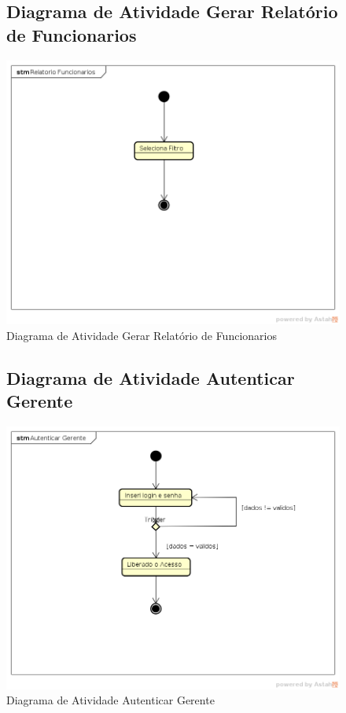 \documentclass[
	12pt,				%
	openright,
	oneside,			%
	a4paper,			%
	chapter=TITLE,		%
	brazil				%
	]{abntex2}
\begin{document}
\begin{figure}[h!]
\subsection{Diagrama de Atividade Gerar Relatório de Funcionarios}
	\caption{Diagrama de Atividade Gerar Relatório de Funcionarios}
	\begin{center}
	    \includegraphics[scale=0.6]{Arquivos/DTE/Relatorio_Funcionarios}  
	\end{center}
\end{figure}



\begin{figure}[h!]
\subsection{Diagrama de Atividade Autenticar Gerente}
	\caption{Diagrama de Atividade Autenticar Gerente}
	\begin{center}
	    \includegraphics[scale=0.6]{Arquivos/DTE/Autenticar_Gerente}  
	\end{center}
\end{figure}
\end{document}
